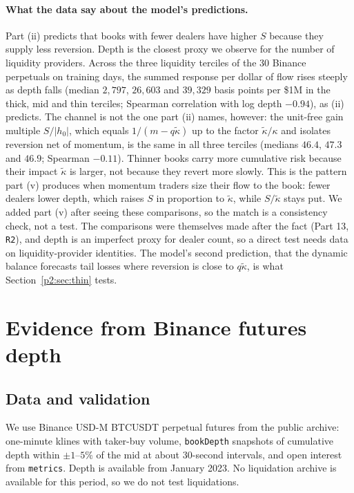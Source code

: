 \paragraph{What the data say about the model's predictions.} Part (ii) predicts that books with fewer dealers have higher $S$ because they supply less reversion. Depth is the closest proxy we observe for the number of liquidity providers. Across the three liquidity terciles of the 30 Binance perpetuals on training days, the summed response per dollar of flow rises steeply as depth falls (median $2{,}797$, $26{,}603$ and $39{,}329$ basis points per \$1M in the thick, mid and thin terciles; Spearman correlation with log depth $-0.94$), as (ii) predicts. The channel is not the one part (ii) names, however: the unit-free gain multiple $S/|h_0|$, which equals $1/(m-q\tilde\kappa)$ up to the factor $\tilde\kappa/\kappa$ and isolates reversion net of momentum, is the same in all three terciles (medians $46.4$, $47.3$ and $46.9$; Spearman $-0.11$). Thinner books carry more cumulative risk because their impact $\tilde\kappa$ is larger, not because they revert more slowly. This is the pattern part (v) produces when momentum traders size their flow to the book: fewer dealers lower depth, which raises $S$ in proportion to $\tilde\kappa$, while $S/\tilde\kappa$ stays put. We added part (v) after seeing these comparisons, so the match is a consistency check, not a test. The comparisons were themselves made after the fact (Part 13, \texttt{R2}), and depth is an imperfect proxy for dealer count, so a direct test needs data on liquidity-provider identities. The model's second prediction, that the dynamic balance forecasts tail losses where reversion is close to $q\tilde\kappa$, is what Section~\ref{p2:sec:thin} tests.
\section{Evidence from Binance futures depth}\label{p2:sec:depth}

\subsection{Data and validation}
We use Binance USD-M BTCUSDT perpetual futures from the public archive: one-minute klines with taker-buy volume, \texttt{bookDepth} snapshots of cumulative depth within $\pm1$--$5\%$ of the mid at about 30-second intervals, and open interest from \texttt{metrics}. Depth is available from January 2023. No liquidation archive is available for this period, so we do not test liquidations.

